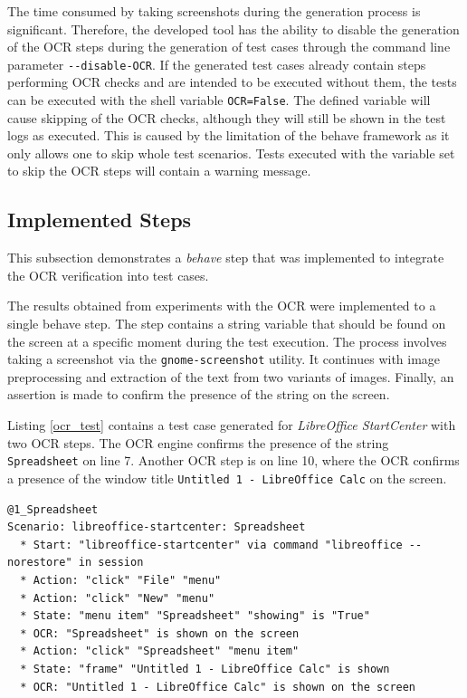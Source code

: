 The time consumed by taking screenshots during the generation process is significant. Therefore, the developed tool has the ability to disable the generation of the OCR steps during the generation of test cases through the command line parameter \texttt{-{}-disable-OCR}. If the generated test cases already contain steps performing OCR checks and are intended to be executed without them, the tests can be executed with the shell variable \texttt{OCR=False}. The defined variable will cause skipping of the OCR checks, although they will still be shown in the test logs as executed. This is caused by the limitation of the behave framework as it only allows one to skip whole test scenarios. Tests executed with the variable set to skip the OCR steps will contain a warning message.

\subsection{Implemented Steps}\label{OCR_steps}
This subsection demonstrates a \textit{behave} step that was implemented to integrate the OCR verification into test cases. 

The results obtained from experiments with the OCR were implemented to a single behave step. The step contains a string variable that should be found on the screen at a specific moment during the test execution. The process involves taking a screenshot via the \texttt{gnome-screenshot} utility. It continues with image preprocessing and extraction of the text from two variants of images. Finally, an assertion is made to confirm the presence of the string on the screen. 

Listing \ref{ocr_test} contains a test case generated for \textit{LibreOffice StartCenter} with two OCR steps. The OCR engine confirms the presence of the string \texttt{Spreadsheet} on line 7. Another OCR step is on line 10, where the OCR confirms a presence of the window title \texttt{Untitled 1 - LibreOffice Calc} on the screen.

\begin{lstlisting}[language=Gherkin,caption={
A test case demonstrating the integration of OCR into test cases},label={ocr_test}]
@1_Spreadsheet
Scenario: libreoffice-startcenter: Spreadsheet
  * Start: "libreoffice-startcenter" via command "libreoffice --norestore" in session
  * Action: "click" "File" "menu"
  * Action: "click" "New" "menu"
  * State: "menu item" "Spreadsheet" "showing" is "True"
  * OCR: "Spreadsheet" is shown on the screen
  * Action: "click" "Spreadsheet" "menu item"
  * State: "frame" "Untitled 1 - LibreOffice Calc" is shown
  * OCR: "Untitled 1 - LibreOffice Calc" is shown on the screen
\end{lstlisting}

